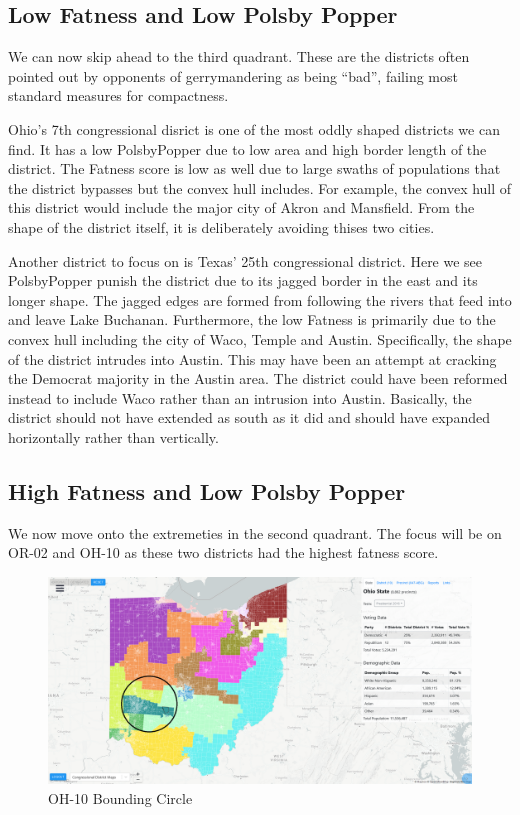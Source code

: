 \documentclass[letterpaper]{article}
\begin{document}
\subsection{Low Fatness and Low Polsby Popper}
We can now skip ahead to the third quadrant. These are the districts often pointed out by opponents of gerrymandering as being “bad”, failing most standard measures for compactness.

Ohio's 7th congressional disrict is one of the most oddly shaped districts we can find. It has a low PolsbyPopper due to low area and high border length of the district. The Fatness score is low as well due to large swaths of populations that the district bypasses but the convex hull includes. For example, the convex hull of this district would include the major city of Akron and Mansfield. From the shape of the district itself, it is deliberately avoiding thises two cities.

Another district to focus on is Texas' 25th congressional district. Here we see PolsbyPopper punish the district due to its jagged border in the east and its longer shape. The jagged edges are formed from following the rivers that feed into and leave Lake Buchanan. Furthermore, the low Fatness is primarily due to the convex hull including the city of Waco, Temple and Austin. Specifically, the shape of the district intrudes into Austin. This may have been an attempt at cracking the Democrat majority in the Austin area. The district could have been reformed instead to include Waco rather than an intrusion into Austin. Basically, the district should not have extended as south as it did and should have expanded horizontally rather than vertically.

\subsection{High Fatness and Low Polsby Popper}
We now move onto the extremeties in the second quadrant. The focus will be on OR-02 and OH-10 as these two districts had the highest fatness score.

\begin{figure}[H]
	\includegraphics[width=\linewidth]{./figures/OH-10-BoundingCircle.png}
	\caption{OH-10 Bounding Circle}
	\label{fig:oh10boundingCircle}
\end{figure}
\end{document}
